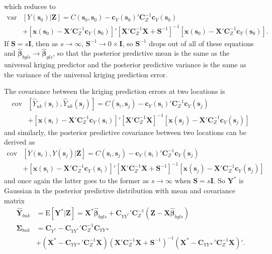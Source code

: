 \documentclass[12pt]{article}
\newcommand{\var}{\mathrm{var}}
\newcommand{\cov}{\mathrm{cov}}
\newcommand{\E}{\mathrm{E}}
\begin{document}
which reduces to
\begin{align*}
\var&\left[Y(\bm{s}_0)|\bm{Z}\right] =C(\bm{s}_0, \bm{s}_0) - \bm{c}_Y(\bm{s}_0)'\bm{C}_Z^{-1}\bm{c}_Y(\bm{s}_0) \\
&+ [\bm{x}(\bm{s}_0) - \bm{X}'\bm{C}_Z^{-1}\bm{c}_Y(\bm{s}_0)]'[\bm{X}'\bm{C}_Z^{-1}\bm{X} + \bm{S}^{-1}]^{-1}[\bm{x}(\bm{s}_0) - \bm{X}'\bm{C}_Z^{-1}\bm{c}_Y(\bm{s}_0)].
\end{align*}
If $\bm{S}=s\bm{I}$, then as $s\to\infty$, $\bm{S}^{-1}\to 0\times \bm{I}$, so $\bm{S}^{-1}$ drops out of all of these equations and $\widehat{\bm{\beta}}_{bgls}\to\widehat{\bm{\beta}}_{gls}$, so that the posterior predictive mean is the same as the universal kriging predictor and the posterior predictive variance is the same as the variance of the universal kriging prediction error.

The covariance between the kriging prediction errors at two locations is
\begin{align*}
\cov&[\widehat{Y}_{uk}(\bm{s}_i),\widehat{Y}_{uk}(\bm{s}_j)] = C(\bm{s}_i,\bm{s}_j) - \bm{c}_Y(\bm{s}_i)'\bm{C}_Z^{-1}\bm{c}_Y(\bm{s}_j)\\
&+ [\bm{x}(\bm{s}_i) - \bm{X}'\bm{C}_Z^{-1}\bm{c}_Y(\bm{s}_i)]'[\bm{X}'\bm{C}_Z^{-1}\bm{X}]^{-1}[\bm{x}(\bm{s}_j) - \bm{X}'\bm{C}_Z^{-1}\bm{c}_Y(\bm{s}_j)]
\end{align*}
and similarly, the posterior predictive covariance between two locations can be derived as
\begin{align*}
\cov&[Y(\bm{s}_i),Y(\bm{s}_j)|\bm{Z}] = C(\bm{s}_i,\bm{s}_j) - \bm{c}_Y(\bm{s}_i)'\bm{C}_Z^{-1}\bm{c}_Y(\bm{s}_j)\\
&+ [\bm{x}(\bm{s}_i) - \bm{X}'\bm{C}_Z^{-1}\bm{c}_Y(\bm{s}_i)]'[\bm{X}'\bm{C}_Z^{-1}\bm{X} + \bm{S}^{-1}]^{-1}[\bm{x}(\bm{s}_j) - \bm{X}'\bm{C}_Z^{-1}\bm{c}_Y(\bm{s}_j)]
\end{align*}
and once again the latter goes to the former as $s\to\infty$ when $\bm{S}=s\bm{I}$. So $\bm{Y}^*$ is Gaussian in the posterior predictive distribution with mean and covariance matrix
\begin{align*}
\widehat{\bm{Y}}_{buk} &= \E[\bm{Y}^*|\bm{Z}] = \bm{X}^{*}\widehat{\bm{\beta}}_{bgls} + \bm{C}_{YY^*}'\bm{C}_Z^{-1}(\bm{Z} - \bm{X}\widehat{\bm{\beta}}_{bgls})\\
\bm{\Sigma}_{buk} &= \bm{C}_{Y^*} - \bm{C}_{YY^*}'\bm{C}_Z^{-1}\bm{C}_{YY*}\\
&+ (\bm{X}^* - \bm{C}_{YY*}'\bm{C}_Z^{-1}\bm{X})(\bm{X}'\bm{C}_Z^{-1}\bm{X} + \bm{S}^{-1})^{-1}(\bm{X}^* - \bm{C}_{YY*}'\bm{C}_Z^{-1}\bm{X})'.
\end{align*}
\end{document}
